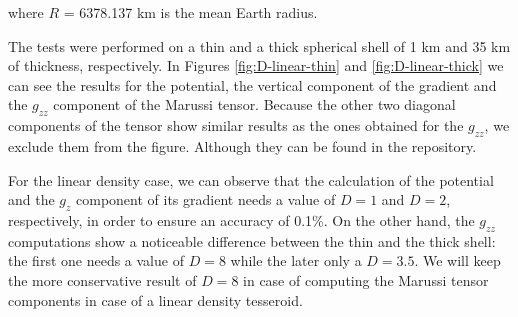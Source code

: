 \documentclass[extra]{gji}
\begin{document}
\noindent where $R$ = 6378.137 km is the mean Earth radius.

The tests were performed on a thin and a thick spherical shell of 1 km and 35 km of thickness, respectively.
In Figures \ref{fig:D-linear-thin} and \ref{fig:D-linear-thick} we can see the results for the potential, the vertical component of the gradient and the $g_{zz}$ component of the Marussi tensor.
Because the other two diagonal components of the tensor show similar results as the ones obtained for the $g_{zz}$, we exclude them from the figure.
Although they can be found in the repository. 

For the linear density case, we can observe that the calculation of the potential and the $g_z$ component of its gradient needs a value of $D=1$ and $D=2$, respectively, in order to ensure an accuracy of 0.1\%.
On the other hand, the $g_{zz}$ computations show a noticeable difference between the thin and the thick shell: the first one needs a value of $D=8$ while the later only a $D=3.5$.
We will keep the more conservative result of $D=8$ in case of computing the Marussi tensor components in case of a linear density tesseroid.
\end{document}
